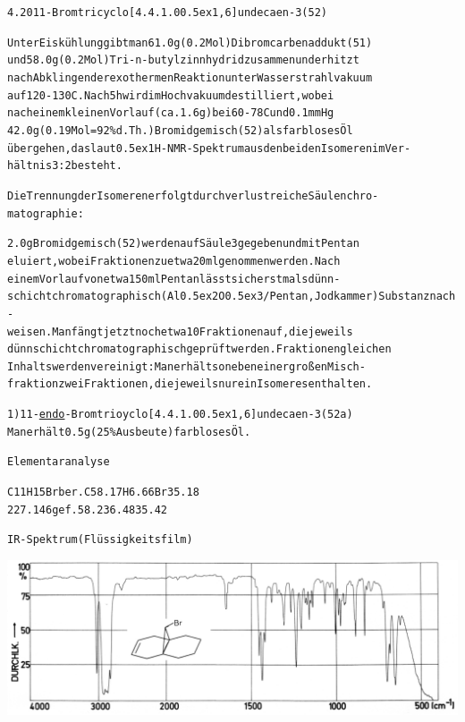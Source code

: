 \documentclass[a4paper,11pt]{article}
\begin{document}
\begin{alltt}
\newpage
{}


4.20 11-Bromtricyclo[4.4.1.0\raise0.5ex\hbox{1,6}]undecaen-3 (52)

Unter Eiskühlung gibt man 61.0 g (0.2 Mol) Dibromcarbenaddukt (51)
und 58.0 g (0.2 Mol) Tri-n-butylzinnhydrid zusammen und erhitzt
nach Abklingen der exothermen Reaktion unter Wasserstrahlvakuum
auf 120 - 130\degree{}C. Nach 5 h wird im Hochvakuum destilliert, wobei
nach einem kleinen Vorlauf (ca. 1.6 g) bei 60 - 78\degree{}C und 0.1 mm Hg
42.0 g (0.19 Mol = 92 \% d.Th.) Bromidgemisch (52) als farbloses Öl
übergehen, das laut \raise0.5ex\hbox{1}H-NMR-Spektrum aus den beiden Isomeren im Ver-
hältnis 3:2 besteht.

Die Trennung der Isomeren erfolgt durch verlustreiche Säulenchro-
matographie:

2.0 g Bromidgemisch (52) werden auf Säule 3 gegeben und mit Pentan
eluiert, wobei Fraktionen zu etwa 20 ml genommen werden. Nach
einem Vorlauf von etwa 150 ml Pentan lässt sich erstmals dünn-
schichtchromatographisch (Al\lower0.5ex\hbox{2}O\lower0.5ex\hbox{3}/Pentan, Jodkammer) Substanz nach-
weisen. Man fängt jetzt noch etwa 10 Fraktionen auf, die jeweils
dünnschichtchromatographisch geprüft werden. Fraktionen gleichen
Inhalts werden vereinigt: Man erhält so neben einer großen Misch-
fraktion zwei Fraktionen, die jeweils nur ein Isomeres enthalten.

1) 11-\underline{endo}-Bromtrioyclo[4.4.1.0\raise0.5ex\hbox{1,6}]undecaen-3 (52a)
Man erhält 0.5 g (25 \% Ausbeute) farbloses Öl.

Elementaranalyse

C11H15Br ber. C 58.17 H 6.66 Br 35.18
227.146  gef.   58.23   6.48    35.42


\newpage
{}


IR-Spektrum (Flüssigkeitsfilm)
\end{alltt}
\hspace*{-0.5cm}\includegraphics[width=14.92cm]{IR_048}
\end{document}
